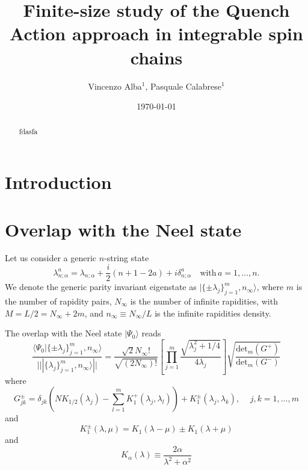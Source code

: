 \documentclass[11pt]{iopart}
\begin{document}
\setlength{\parindent}{0pt}


\title{Finite-size study of the Quench Action approach in integrable spin 
chains}

\author{Vincenzo Alba$^1$, Pasquale Calabrese$^1$}
\address{$^1$ International School for Advanced Studies (SISSA),
Via Bonomea 265, 34136, Trieste, Italy,
INFN, Sezione di Trieste}


\date{\today}



\begin{abstract} 


fdasfa
\end{abstract}

\maketitle

\section{Introduction}
\label{intro}

\section{Overlap with the Neel state}

Let us consider a generic $n$-string state
%
\begin{equation}
\lambda_{n;\alpha}^{a}=\lambda_{n;\alpha}+\frac{i}{2}(n+1-2a)+i\delta_{n;\alpha}^{a}
\quad\textrm{with}\, a=1,\dots, n.
\end{equation}
%
We denote the generic parity invariant eigenstate as $|\{\pm\lambda_j\}_{j=1}^m,n_\infty\rangle$, 
where $m$ is the number of rapidity pairs, $N_{\infty}$ is the number of infinite rapidities, 
with $M=L/2=N_\infty+2m$, and $n_\infty\equiv N_\infty/L$ is the infinite rapidities density. 

The overlap with the Neel state $|\Psi_0\rangle$ reads 
%
\begin{equation}
\label{neel-ov}
\frac{\langle\Psi_0|\{\pm\lambda_j\}_{j=1}^m,n_\infty\rangle}{|||\{\lambda_j\}_{j=1}^m,n_\infty\rangle||}=
\frac{\sqrt{2}N_{\infty}!}{\sqrt{(2N_\infty)!}}\left[\prod_{j=1}^m\frac{\sqrt{\lambda_j^2+1/4}}{4\lambda_j}
\right]\sqrt{\frac{\textrm{det}_m(G^+)}{\textrm{det}_m(G^-)}}
\end{equation}
%
where 
%
\begin{equation}
\label{G-pm}
G^{\pm}_{jk}=\delta_{jk}\left(NK_{1/2}(\lambda_j)-\sum\limits_{l=1}^mK_1^+(\lambda_j,\lambda_l)\right)
+K_{1}^{\pm}(\lambda_j,\lambda_k),\quad\,j,k=1,\dots,m
\end{equation}
%
and 
%
\begin{equation}
\label{K-1}
K_1^\pm(\lambda,\mu)=K_1(\lambda-\mu)\pm K_1(\lambda+\mu)
\end{equation}
%
and 
%
\begin{equation}
\label{K-alpha}
K_\alpha(\lambda)\equiv\frac{2\alpha}{\lambda^2+\alpha^2}
\end{equation}
%
\end{document}

